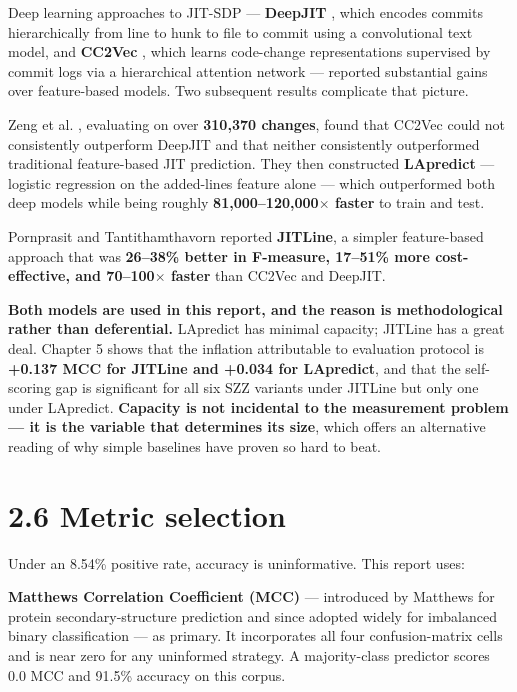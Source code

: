Deep learning approaches to JIT-SDP --- \textbf{DeepJIT}
\citep{hoang2019deepjit}, which encodes commits hierarchically from line
to hunk to file to commit using a convolutional text model, and
\textbf{CC2Vec} \citep{hoang2020cc2vec}, which learns code-change
representations supervised by commit logs via a hierarchical attention
network --- reported substantial gains over feature-based models. Two
subsequent results complicate that picture.

Zeng et al. \citep{zeng2021lapredict}, evaluating on over
\textbf{310,370 changes}, found that CC2Vec could not consistently
outperform DeepJIT and that neither consistently outperformed
traditional feature-based JIT prediction. They then constructed
\textbf{LApredict} --- logistic regression on the added-lines feature
alone --- which outperformed both deep models while being roughly
\textbf{81,000--120,000\ensuremath{\times} faster} to train and test.

Pornprasit and Tantithamthavorn \citep{pornprasit2021jitline} reported
\textbf{JITLine}, a simpler feature-based approach that was
\textbf{26--38\% better in F-measure, 17--51\% more cost-effective, and
70--100\ensuremath{\times} faster} than CC2Vec and DeepJIT.

\textbf{Both models are used in this report, and the reason is
methodological rather than deferential.} LApredict has minimal capacity;
JITLine has a great deal. Chapter 5 shows that the inflation
attributable to evaluation protocol is \textbf{+0.137 MCC for JITLine
and +0.034 for LApredict}, and that the self-scoring gap is significant
for all six SZZ variants under JITLine but only one under LApredict.
\textbf{Capacity is not incidental to the measurement problem --- it is
the variable that determines its size}, which offers an alternative
reading of why simple baselines have proven so hard to beat.

\section{2.6 Metric selection}\label{metric-selection}

Under an 8.54\% positive rate, accuracy is uninformative. This report
uses:

\textbf{Matthews Correlation Coefficient (MCC)} --- introduced by
Matthews \citep{matthews1975mcc} for protein secondary-structure
prediction and since adopted widely for imbalanced binary classification
--- as primary. It incorporates all four confusion-matrix cells and is
near zero for any uninformed strategy. A majority-class predictor scores
0.0 MCC and 91.5\% accuracy on this corpus.

